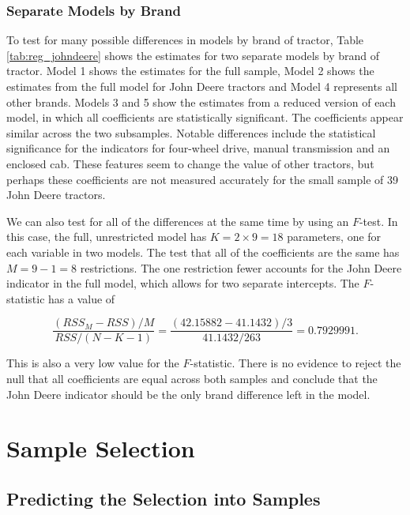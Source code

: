 \subsubsection{Separate Models by Brand}

To test for many possible differences in 
models by brand of tractor, 
Table \ref{tab:reg_johndeere}
shows the estimates for two separate models
by brand of tractor.
%
Model 1 shows the estimates for 
the full sample,
Model 2 shows the estimates from the full model for 
John Deere tractors
and Model 4 
represents all other brands. 
% 
Models 3 and 5 show the estimates from a reduced version of each model, 
in which all coefficients are statistically significant. 
% 
The coefficients appear similar across the two subsamples.
Notable differences include the statistical significance for 
the indicators for four-wheel drive, 
manual transmission and an enclosed cab. 
These features seem to change the value of 
other tractors, but perhaps these coefficients are not measured 
accurately for the small sample of 39 
John Deere tractors. 



We can also test for all of the differences at the same time
by using an $F$-test. 
In this case, the full, unrestricted model has $K = 2\times9 = 18$ parameters, one for each variable in two models. 
The test that all of the coefficients are the same has $M = 9 - 1 = 8$
restrictions. 
The one restriction fewer accounts for the John Deere indicator
in the full model, 
which allows for two separate intercepts. 
% 
The $F$-statistic has a value of 

$$ 
\frac{(RSS_M - RSS)/M}{RSS/(N - K - 1)} = \frac{(42.15882 - 41.1432)/3}{41.1432/263} = 0.7929991. 
$$

This is also a very low value for the $F$-statistic. 
There is no evidence to reject the null that all 
coefficients are equal across both samples 
and conclude that the John Deere indicator
should be the only brand difference left in the model. 



\clearpage
\section{Sample Selection}


\subsection{Predicting the Selection into Samples}


